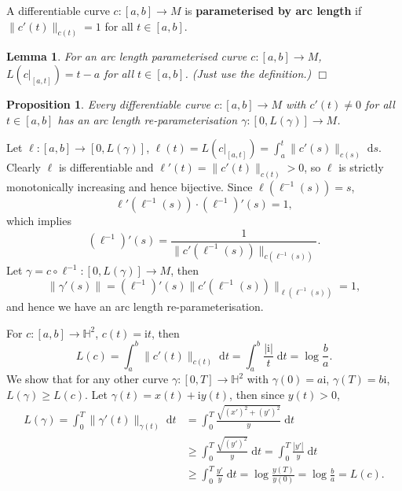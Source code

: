 \documentclass[letter-paper]{tufte-book}
\newtheorem{lemma}[theorem]{\color{pastel-blue}Lemma}
\newtheorem{proposition}[theorem]{\color{pastel-blue}Proposition}
\newenvironment{proof}[1][Proof]{\begin{trivlist}
\item[\hskip \labelsep {\bfseries #1}]}{\end{trivlist}}
\newenvironment{example}[1][Example]{\begin{trivlist}
\item[\hskip \labelsep {\bfseries #1}]}{\end{trivlist}}
\newcommand{\qedwhite}{\hfill \ensuremath{\Box}}
\begin{document}
A differentiable curve $c: [a,b] \to M$ is \textbf{parameterised by arc length} if $\|c'(t)\|_{c(t)} = 1$ for all $t \in [a,b]$.

\begin{lemma}
  For an arc length parameterised curve $c:[a,b] \to M$, $L(c|_{[a,t]}) = t-a$ for all $t\in [a,b]$. (Just use the definition.) \qedwhite
\end{lemma}

\begin{proposition}
  Every differentiable curve $c:[a,b] \to M$ with $c'(t) \neq 0$ for all $t\in [a,b]$ has an arc length re-parameterisation $\gamma : [0, L(\gamma)] \to M$.
\end{proposition}

\begin{proof}
  Let $\ell : [a,b] \to [0, L(\gamma)]$, $\ell(t) = L(c|_{[a,t]}) = \int_a^t \|c'(s)\|_{c(s)}\; \mathrm{d}s$. Clearly $\ell$ is differentiable and $\ell'(t) = \|c'(t)\|_{c(t)} > 0$, so $\ell$ is strictly monotonically increasing and hence bijective. Since $\ell(\ell^{-1}(s)) = s$,
  \begin{equation*}
    \ell'(\ell^{-1}(s))\cdot (\ell^{-1})'(s) = 1,
  \end{equation*}
  which implies
  \begin{equation*}
   (\ell^{-1})'(s) = \frac{1}{\|c'(\ell^{-1}(s))\|_{c(\ell^{-1}(s))}}.
  \end{equation*}
  Let $\gamma = c \circ \ell^{-1} : [0, L(\gamma)] \to M$, then
  \begin{equation*}
    \|\gamma'(s)\| = (\ell^{-1})'(s) \|c'(\ell^{-1}(s))\|_{\ell(\ell^{-1}(s))} = 1,
  \end{equation*}
  and hence we have an arc length re-parameterisation.
\end{proof}

\begin{example}
  For $c : [a,b] \to \mathbb{H}^2$,  $c(t) = \mathrm{i}t$, then
  \begin{equation*}
    L(c) = \int_a^b \|c'(t)\|_{c(t)}\; \mathrm{d}t = \int_a^b \frac{|\mathrm{i}|}{t}\; \mathrm{d}t = \log \frac{b}{a}.
  \end{equation*}
  We show that for any other curve $\gamma:[0,T] \to \mathbb{H}^2$ with $\gamma(0)=a\mathrm{i}$, $\gamma(T)=b\mathrm{i}$, $L(\gamma) \geq L(c)$. Let $\gamma(t) = x(t) + \mathrm{i}y(t)$, then since $y(t)>0$,
  \begin{align*}
    L(\gamma) = \int_0^T \|\gamma'(t)\|_{\gamma(t)}\; \mathrm{d}t
      &= \int_0^T \frac{\sqrt{(x')^2 + (y')^2}}{y}\; \mathrm{d}t\\
      &\geq \int_0^T \frac{\sqrt{(y')^2}}{y}\; \mathrm{d}t = \int_0^T \frac{|y'|}{y}\; \mathrm{d}t\\
      &\geq \int_0^T \frac{y'}{y}\; \mathrm{d}t = \log \frac{y(T)}{y(0)} = \log \frac{b}{a} = L(c).
  \end{align*}
\end{example}
\end{document}
